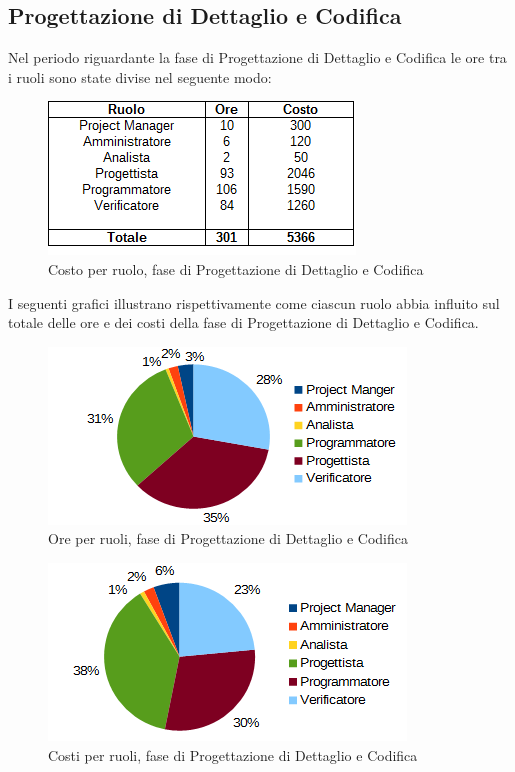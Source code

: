 	\subsection{Progettazione di Dettaglio e Codifica}
	Nel periodo riguardante la fase di Progettazione di Dettaglio e Codifica le ore tra i ruoli sono state divise nel seguente modo: \\
	\begin{figure}[H]
		\centering
		\includegraphics[scale=0.75]{immagini/tabelle/progettazione_dettaglio_codifica-costo.png}
		\caption{Costo per ruolo, fase di Progettazione di Dettaglio e Codifica}
	\end{figure}
	I seguenti grafici illustrano rispettivamente come ciascun ruolo abbia influito sul totale
delle ore e dei costi della fase di Progettazione di Dettaglio e Codifica. \\
	\begin{figure}[H]
		\centering
		\includegraphics[scale=1]{immagini/grafici/progettazione_dettaglio_codifica-torta.png}
		\caption{Ore per ruoli, fase di Progettazione di Dettaglio e Codifica}
	\end{figure}
	\begin{figure}[H]
		\centering
		\includegraphics[scale=1]{immagini/grafici/progettazione_dettaglio_codifica-torta-costo.png}
		\caption{Costi per ruoli, fase di Progettazione di Dettaglio e Codifica}
	\end{figure}
